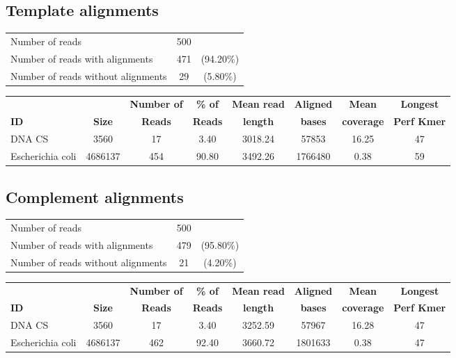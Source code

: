 \documentclass[a4paper,11pt,oneside]{article}
\begin{document}
\subsection*{Template alignments}
\vspace{-3mm}
\begin{table}[H]
{\footnotesize
\fontsize{9pt}{11pt}\selectfont
\begin{tabular}{l c c}
Number of reads & 500 & \\
Number of reads with alignments & 471 & (94.20\%) \\
Number of reads without alignments & 29 & (5.80\%) \\
\end{tabular}
}
\end{table}
\vspace{-10mm}
\begin{table}[H]
{\footnotesize
\fontsize{9pt}{11pt}\selectfont
\begin{tabular}{l c c c c c c c}
          &             & {\bf Number of} & {\bf \% of} & {\bf Mean read} & {\bf Aligned} & {\bf Mean} & {\bf Longest} \\
{\bf ID} & {\bf Size} & {\bf Reads}     & {\bf Reads}  & {\bf length}    & {\bf bases}   & {\bf coverage} & {\bf Perf Kmer} \\
DNA CS & 3560 & 17 & 3.40 & 3018.24 & 57853 & 16.25 & 47 \\
Escherichia coli & 4686137 & 454 & 90.80 & 3492.26 & 1766480 & 0.38 & 59 \\
\end{tabular}
}
\end{table}
\subsection*{Complement alignments}
\vspace{-3mm}
\begin{table}[H]
{\footnotesize
\fontsize{9pt}{11pt}\selectfont
\begin{tabular}{l c c}
Number of reads & 500 & \\
Number of reads with alignments & 479 & (95.80\%) \\
Number of reads without alignments & 21 & (4.20\%) \\
\end{tabular}
}
\end{table}
\vspace{-10mm}
\begin{table}[H]
{\footnotesize
\fontsize{9pt}{11pt}\selectfont
\begin{tabular}{l c c c c c c c}
          &             & {\bf Number of} & {\bf \% of} & {\bf Mean read} & {\bf Aligned} & {\bf Mean} & {\bf Longest} \\
{\bf ID} & {\bf Size} & {\bf Reads}     & {\bf Reads}  & {\bf length}    & {\bf bases}   & {\bf coverage} & {\bf Perf Kmer} \\
DNA CS & 3560 & 17 & 3.40 & 3252.59 & 57967 & 16.28 & 47 \\
Escherichia coli & 4686137 & 462 & 92.40 & 3660.72 & 1801633 & 0.38 & 47 \\
\end{tabular}
}
\end{table}
\end{document}
